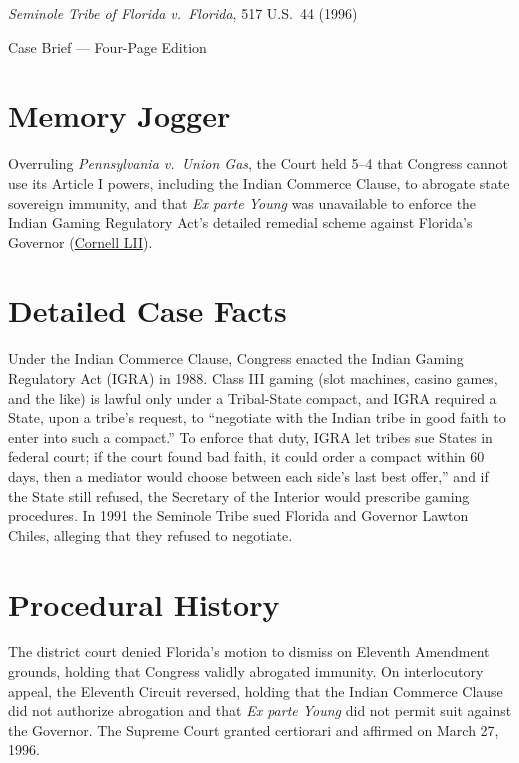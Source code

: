 \documentclass[12pt]{article}
\begin{document}
\begin{center}
{\LARGE \textit{Seminole Tribe of Florida v.\ Florida}, 517 U.S.\ 44 (1996)\par}
\vspace{0.8em}
{\large Case Brief --- Four-Page Edition\par}
\end{center}
\vspace{1em}

\section{Memory Jogger}

Overruling \textit{Pennsylvania v.\ Union Gas}, the Court held 5--4 that Congress cannot use its Article I powers, including the Indian Commerce Clause, to abrogate state sovereign immunity, and that \textit{Ex parte Young} was unavailable to enforce the Indian Gaming Regulatory Act's detailed remedial scheme against Florida's Governor (\href{https://www.law.cornell.edu/supct/html/94-12.ZO.html}{Cornell LII}).

\section{Detailed Case Facts}

Under the Indian Commerce Clause, Congress enacted the Indian Gaming Regulatory Act (IGRA) in 1988. Class III gaming (slot machines, casino games, and the like) is lawful only under a Tribal-State compact, and IGRA required a State, upon a tribe's request, to ``negotiate with the Indian tribe in good faith to enter into such a compact.'' To enforce that duty, IGRA let tribes sue States in federal court; if the court found bad faith, it could order a compact within 60 days, then a mediator would choose between each side's last best offer,'' and if the State still refused, the Secretary of the Interior would prescribe gaming procedures. In 1991 the Seminole Tribe sued Florida and Governor Lawton Chiles, alleging that they refused to negotiate.

\section{Procedural History}

The district court denied Florida's motion to dismiss on Eleventh Amendment grounds, holding that Congress validly abrogated immunity. On interlocutory appeal, the Eleventh Circuit reversed, holding that the Indian Commerce Clause did not authorize abrogation and that \textit{Ex parte Young} did not permit suit against the Governor. The Supreme Court granted certiorari and affirmed on March 27, 1996.
\end{document}
